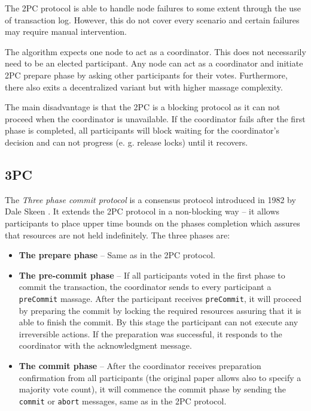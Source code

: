 \documentclass[oneside,
  digital, %
  table,   %
  nolof,     %
  nolot,     %
]{fithesis3}
\begin{document}
The 2PC protocol is able to handle node failures to some extent through the use of transaction log. However, this do not cover every scenario and certain failures may require manual intervention.

The algorithm expects one node to act as a coordinator. This does not necessarily need to be an elected participant. Any node can act as a coordinator and initiate 2PC prepare phase by asking other participants for their votes. Furthermore, there also exits a decentralized variant but with higher massage complexity.

The main disadvantage is that the 2PC is a blocking protocol as it can not proceed when the coordinator is unavailable. If the coordinator fails after the first phase is completed, all participants will block waiting for the coordinator's decision and can not progress (e. g. release locks) until it recovers.

\subsection{3PC}

The \textit{Three phase commit protocol} is a consensus protocol introduced in 1982 by Dale Skeen \cite{3PC}. It extends the 2PC protocol in a non-blocking way -- it allows participants to place upper time bounds on the phases completion which assures that resources are not  held indefinitely. The three phases are:

\begin{itemize}
    \item \textbf{The prepare phase} -- Same as in the 2PC protocol.
    
    \item \textbf{The pre-commit phase} -- If all participants voted in the first phase to commit the transaction, the coordinator sends to every participant a \texttt{preCommit} massage. After the participant receives \texttt{preCommit}, it will proceed by preparing the commit by locking the required resources assuring that it is able to finish the commit. By this stage the participant can not execute any irreversible actions. If the preparation was successful, it responds to the coordinator with the acknowledgment message.
    
    \item \textbf{The commit phase} -- After the coordinator receives preparation confirmation from all participants (the original paper \cite{3PC} allows also to specify a majority vote count), it will commence the commit phase by sending the \texttt{commit} or \texttt{abort} messages, same as in the 2PC protocol.
\end{itemize}
\end{document}
